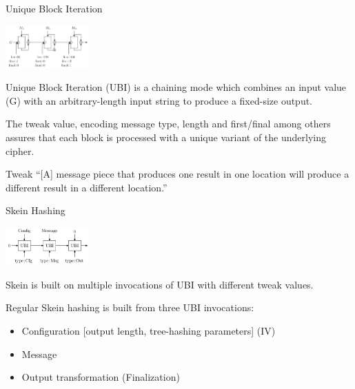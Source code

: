 \documentclass{beamer}
\begin{document}
\begin{frame}{Unique Block Iteration}

	\begin{center}\includegraphics[width=120px]{ubi}\end{center}

	Unique Block Iteration (UBI) is a chaining mode which combines an input value (G) with an arbitrary-length input string to produce a fixed-size output.

	\vspace{2mm}
	The tweak value, encoding message type, length and first/final among others assures that each block is processed with a unique variant of the underlying cipher.

	\begin{block}{Tweak}
		``[A] message piece that produces one result in one location will produce a different result in a different location.''
	\end{block}

\end{frame}

\begin{frame}{Skein Hashing}

	\begin{center}\includegraphics[width=120px]{skein-simple}\end{center}

	Skein is built on multiple invocations of UBI with different tweak values.

	\vspace{2mm}
	Regular Skein hashing is built from three UBI invocations:

	\vspace{2mm}
	\begin{itemize}
		\item Configuration [output length, tree-hashing parameters] (IV)
		\item Message
		\item Output transformation (Finalization)
	\end{itemize}
\end{frame}
\end{document}
